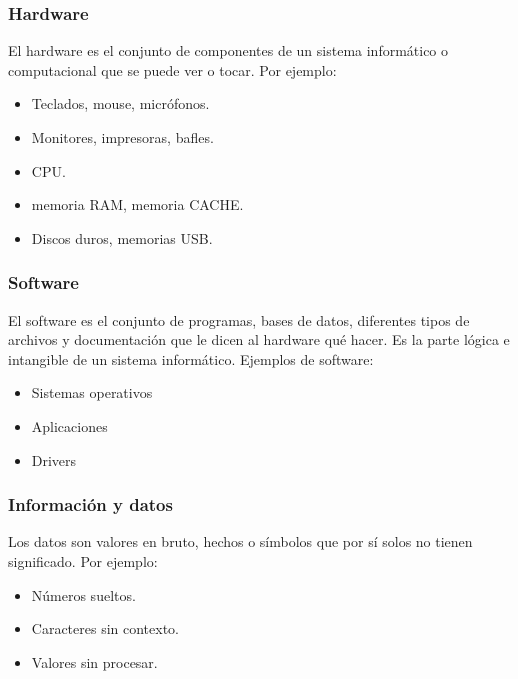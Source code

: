 \documentclass[letterpaper,10pt,spanish]{sphinxmanual}
\begin{document}
\subsubsection{Hardware}
\label{\detokenize{1_guias/10programacion/G1029:hardware}}
\sphinxAtStartPar
El hardware es el conjunto de componentes de un sistema informático o computacional que se puede ver o tocar. Por ejemplo:
\begin{itemize}
\item {} 
\sphinxAtStartPar
{} Teclados, mouse, micrófonos.

\item {} 
\sphinxAtStartPar
{} Monitores, impresoras, bafles.

\item {} 
\sphinxAtStartPar
{} CPU.

\item {} 
\sphinxAtStartPar
{} memoria RAM, memoria CACHE.

\item {} 
\sphinxAtStartPar
{} Discos duros, memorias USB.

\end{itemize}


\subsubsection{Software}
\label{\detokenize{1_guias/10programacion/G1029:software}}
\sphinxAtStartPar
El software es el conjunto de programas, bases de datos, diferentes tipos de archivos y documentación que le dicen al hardware qué hacer. Es la parte lógica e intangible de un sistema informático. Ejemplos de software:
\begin{itemize}
\item {} 
\sphinxAtStartPar
Sistemas operativos

\item {} 
\sphinxAtStartPar
Aplicaciones

\item {} 
\sphinxAtStartPar
Drivers

\end{itemize}


\subsubsection{Información y datos}
\label{\detokenize{1_guias/10programacion/G1029:informacion-y-datos}}
\sphinxAtStartPar
Los datos son valores en bruto, hechos o símbolos que por sí solos no tienen significado. Por ejemplo:
\begin{itemize}
\item {} 
\sphinxAtStartPar
Números sueltos.

\item {} 
\sphinxAtStartPar
Caracteres sin contexto.

\item {} 
\sphinxAtStartPar
Valores sin procesar.

\end{itemize}
\end{document}
